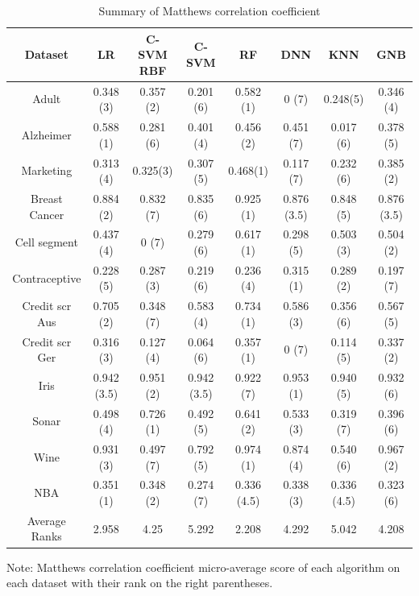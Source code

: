 \documentclass[a4paper,12pt]{article}
\numberwithin{equation}{section}
\begin{document}
\begin{appendices}
\begin{table}[H]
\begin{center}
\caption{Summary of Matthews correlation coefficient}
\begin{threeparttable}
\begin{tabular}{ |c|c|c|c|c|c|c|c| } 
 \hline
 Dataset & LR & C-SVM RBF & C-SVM & RF & DNN & KNN & GNB \\ 
 \hline 
 Adult & 0.348 (3) & 0.357 (2) & 0.201 (6)& 0.582 (1) & 0 (7) & 0.248(5) & 0.346 (4)\\[1pt]
 Alzheimer & 0.588 (1) & 0.281 (6) & 0.401 (4) & 0.456 (2) & 0.451 (7)& 0.017 (6)& 0.378 (5) \\[1pt]
 Marketing & 0.313 (4) & 0.325(3) & 0.307 (5) & 0.468(1) & 0.117 (7) & 0.232 (6)& 0.385 (2)\\[1pt]
 Breast Cancer & 0.884 (2)& 0.832 (7) & 0.835 (6) & 0.925 (1) & 0.876 (3.5) & 0.848 (5) & 0.876 (3.5)\\[1pt]
 Cell segment & 0.437 (4) & 0 (7) & 0.279 (6) & 0.617 (1) & 0.298 (5)& 0.503 (3)& 0.504 (2) \\[1pt]
 Contraceptive & 0.228 (5) & 0.287 (3) & 0.219 (6) & 0.236 (4) & 0.315 (1) & 0.289 (2) & 0.197 (7) \\[1pt]
 Credit scr Aus & 0.705 (2) & 0.348 (7) & 0.583 (4) & 0.734 (1) & 0.586 (3) & 0.356 (6) & 0.567 (5) \\[1pt]
 Credit scr Ger & 0.316 (3) & 0.127 (4) & 0.064 (6) & 0.357 (1) & 0 (7) & 0.114 (5) & 0.337 (2)\\[1pt]
 Iris & 0.942 (3.5) & 0.951 (2) & 0.942 (3.5) & 0.922 (7) & 0.953 (1) & 0.940 (5) & 0.932 (6) \\[1pt]
 Sonar & 0.498 (4) & 0.726 (1) & 0.492 (5) & 0.641 (2) & 0.533 (3) & 0.319 (7) & 0.396 (6) \\[1pt]
 Wine & 0.931 (3) & 0.497 (7) & 0.792 (5) & 0.974 (1) & 0.874 (4) & 0.540 (6) & 0.967 (2) \\[1pt]
 NBA  & 0.351 (1) & 0.348 (2) & 0.274 (7) & 0.336 (4.5) & 0.338 (3) & 0.336 (4.5) & 0.323 (6) \\[1pt]
 \hline
 Average Ranks & 2.958  & 4.25 & 5.292 & 2.208 & 4.292 & 5.042 & 4.208 \\
 \hline

\end{tabular}
\begin{tablenotes}
\small
\item   Note: Matthews correlation coefficient micro-average score of each algorithm on each dataset with their rank on the right parentheses. 
\end{tablenotes}
\end{threeparttable}
\label{table:10}
\end{center}
\end{table}


\end{appendices}
\end{document}
